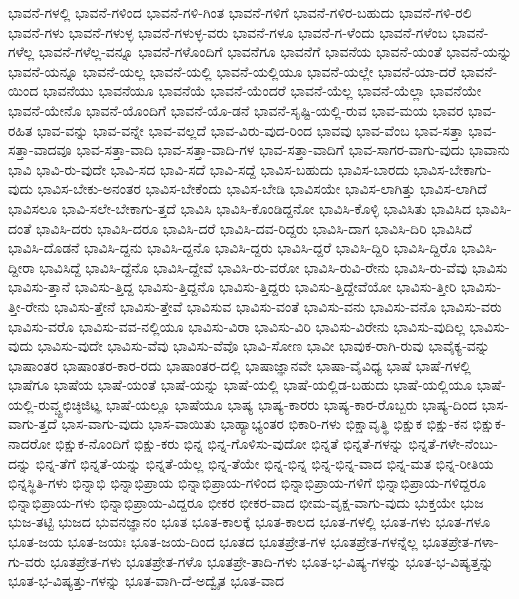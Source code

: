 {ಭಾವನೆ-ಗಳಲ್ಲಿ
ಭಾವನೆ-ಗಳಿಂದ
ಭಾವನೆ-ಗಳಿ-ಗಿಂತ
ಭಾವನೆ-ಗಳಿಗೆ
ಭಾವನೆ-ಗಳಿರ-ಬಹುದು
ಭಾವನೆ-ಗಳಿ-ರಲಿ
ಭಾವನೆ-ಗಳು
ಭಾವನೆ-ಗಳುಳ್ಳ
ಭಾವನೆ-ಗಳುಳ್ಳ-ವರು
ಭಾವನೆ-ಗಳೂ
ಭಾವನೆ-ಗ-ಳೆಂದು
ಭಾವನೆ-ಗಳೆಂಬ
ಭಾವನೆ-ಗಳೆಲ್ಲ
ಭಾವನೆ-ಗಳೆಲ್ಲ-ವನ್ನೂ
ಭಾವನೆ-ಗಳೊಂದಿಗೆ
ಭಾವನೆಗೂ
ಭಾವನೆಗೆ
ಭಾವನೆಯ
ಭಾವನೆ-ಯಂತೆ
ಭಾವನೆ-ಯನ್ನು
ಭಾವನೆ-ಯನ್ನೂ
ಭಾವನೆ-ಯಲ್ಲ
ಭಾವನೆ-ಯಲ್ಲಿ
ಭಾವನೆ-ಯಲ್ಲಿಯೂ
ಭಾವನೆ-ಯಲ್ಲೇ
ಭಾವನೆ-ಯಾ-ದರೆ
ಭಾವನೆ-ಯಿಂದ
ಭಾವನೆಯು
ಭಾವನೆಯೂ
ಭಾವನೆಯೆ
ಭಾವನೆ-ಯೆಂದರೆ
ಭಾವನೆ-ಯೆಲ್ಲ
ಭಾವನೆ-ಯೆಲ್ಲಾ
ಭಾವನೆಯೇ
ಭಾವನೆ-ಯೇನೊ
ಭಾವನೆ-ಯೊಂದಿಗೆ
ಭಾವನೆ-ಯೊ-ಡನೆ
ಭಾವನೆ-ಸೃಷ್ಟಿ-ಯಲ್ಲಿ-ರುವ
ಭಾವ-ಮಯ
ಭಾವರ
ಭಾವ-ರಹಿತ
ಭಾವ-ವನ್ನು
ಭಾವ-ವನ್ನೇ
ಭಾವ-ವಲ್ಲದೆ
ಭಾವ-ವಿರು-ವುದ-ರಿಂದ
ಭಾವವು
ಭಾವ-ವೆಂಬ
ಭಾವ-ಸತ್ತಾ
ಭಾವ-ಸತ್ತಾ-ವಾದವೂ
ಭಾವ-ಸತ್ತಾ-ವಾದಿ
ಭಾವ-ಸತ್ತಾ-ವಾದಿ-ಗಳ
ಭಾವ-ಸತ್ತಾ-ವಾದಿಗೆ
ಭಾವ-ಸಾಗರ-ವಾಗು-ವುದು
ಭಾವಾನು
ಭಾವಿ
ಭಾವಿ-ರು-ವುದೇ
ಭಾವಿ-ಸದ
ಭಾವಿ-ಸದೆ
ಭಾವಿ-ಸದ್ದೆ
ಭಾವಿಸ-ಬಹುದು
ಭಾವಿಸ-ಬಾರದು
ಭಾವಿಸ-ಬೇಕಾಗು-ವುದು
ಭಾವಿಸ-ಬೇಕು-ಅನಂತರ
ಭಾವಿಸ-ಬೇಕೆಂದು
ಭಾವಿಸ-ಬೇಡಿ
ಭಾವಿಸಯೇ
ಭಾವಿಸ-ಲಾಗಿತ್ತು
ಭಾವಿಸ-ಲಾಗಿದೆ
ಭಾವಿಸಲೂ
ಭಾವಿ-ಸಲೇ-ಬೇಕಾಗು-ತ್ತದೆ
ಭಾವಿಸಿ
ಭಾವಿಸಿ-ಕೊಂಡಿದ್ದನೋ
ಭಾವಿಸಿ-ಕೊಳ್ಳಿ
ಭಾವಿಸಿತು
ಭಾವಿಸಿದ
ಭಾವಿಸಿ-ದಂತೆ
ಭಾವಿಸಿ-ದರು
ಭಾವಿಸಿ-ದರೂ
ಭಾವಿಸಿ-ದರೆ
ಭಾವಿಸಿ-ದವ-ರಿದ್ದರು
ಭಾವಿಸಿ-ದಾಗ
ಭಾವಿಸಿ-ದಿರಿ
ಭಾವಿಸಿದೆ
ಭಾವಿಸಿ-ದೊಡನೆ
ಭಾವಿಸಿ-ದ್ದನು
ಭಾವಿಸಿ-ದ್ದನೊ
ಭಾವಿಸಿ-ದ್ದರು
ಭಾವಿಸಿ-ದ್ದರೆ
ಭಾವಿಸಿ-ದ್ದಿರಿ
ಭಾವಿಸಿ-ದ್ದಿರೊ
ಭಾವಿಸಿ-ದ್ದೀರಾ
ಭಾವಿಸಿದ್ದೆ
ಭಾವಿಸಿ-ದ್ದೆನೊ
ಭಾವಿಸಿ-ದ್ದೇವೆ
ಭಾವಿಸಿ-ರು-ವರೋ
ಭಾವಿಸಿ-ರುವಿ-ರೇನು
ಭಾವಿಸಿ-ರು-ವೆವು
ಭಾವಿಸು
ಭಾವಿಸು-ತ್ತಾನೆ
ಭಾವಿಸು-ತ್ತಿದ್ದ
ಭಾವಿಸು-ತ್ತಿದ್ದನೊ
ಭಾವಿಸು-ತ್ತಿದ್ದರು
ಭಾವಿಸು-ತ್ತಿದ್ದೇವೆಯೋ
ಭಾವಿಸು-ತ್ತೀರಿ
ಭಾವಿಸು-ತ್ತೀ-ರೇನು
ಭಾವಿಸು-ತ್ತೇನೆ
ಭಾವಿಸು-ತ್ತೇವೆ
ಭಾವಿಸುವ
ಭಾವಿಸು-ವಂತೆ
ಭಾವಿಸು-ವನು
ಭಾವಿಸು-ವನೊ
ಭಾವಿಸು-ವರು
ಭಾವಿಸು-ವರೊ
ಭಾವಿಸು-ವವ-ನಲ್ಲಿಯೂ
ಭಾವಿಸು-ವಿರಾ
ಭಾವಿಸು-ವಿರಿ
ಭಾವಿಸು-ವಿರೇನು
ಭಾವಿಸು-ವುದಿಲ್ಲ
ಭಾವಿಸು-ವುದು
ಭಾವಿಸು-ವುದೇ
ಭಾವಿಸು-ವೆವು
ಭಾವಿಸು-ವೆವೊ
ಭಾವಿ-ಸೋಣ
ಭಾವೀ
ಭಾವುಕ-ರಾಗಿ-ರುವು
ಭಾವೈಕ್ಯ-ವನ್ನು
ಭಾಷಾಂತರ
ಭಾಷಾಂತರ-ಕಾರ-ರದು
ಭಾಷಾಂತರ-ದಲ್ಲಿ
ಭಾಷಾಜ್ಞಾನವೇ
ಭಾಷಾ-ವೈವಿಧ್ಯ
ಭಾಷೆ
ಭಾಷೆ-ಗಳಲ್ಲಿ
ಭಾಷೆಗೂ
ಭಾಷೆಯ
ಭಾಷೆ-ಯಂತೆ
ಭಾಷೆ-ಯನ್ನು
ಭಾಷೆ-ಯಲ್ಲಿ
ಭಾಷೆ-ಯಲ್ಲಿಡ-ಬಹುದು
ಭಾಷೆ-ಯಲ್ಲಿಯೂ
ಭಾಷೆ-ಯಲ್ಲಿ-ರುವ್ಚ್ಟಛಿಚ್ಠಿಜಿಟ್ಞ
ಭಾಷೆ-ಯಲ್ಲೂ
ಭಾಷೆಯೂ
ಭಾಷ್ಯ
ಭಾಷ್ಯ-ಕಾರರು
ಭಾಷ್ಯ-ಕಾರ-ರೊಬ್ಬರು
ಭಾಷ್ಯ-ದಿಂದ
ಭಾಸ-ವಾಗು-ತ್ತದೆ
ಭಾಸ-ವಾಗು-ವುದು
ಭಾಸ-ವಾಯಿತು
ಭಾಹ್ಯಾಭ್ಯಂತರ
ಭಿಕಾರಿ-ಗಳು
ಭಿಕ್ಷಾವೃತ್ಥಿ
ಭಿಕ್ಷುಕ
ಭಿಕ್ಷು-ಕನ
ಭಿಕ್ಷುಕ-ನಾದರೋ
ಭಿಕ್ಷುಕ-ನೊಂದಿಗೆ
ಭಿಕ್ಷು-ಕರು
ಭಿನ್ನ
ಭಿನ್ನ-ಗೊಳಿಸು-ವುದೋ
ಭಿನ್ನತೆ
ಭಿನ್ನತೆ-ಗಳನ್ನು
ಭಿನ್ನತೆ-ಗಳೇ-ನೆಂಬು-ದನ್ನು
ಭಿನ್ನ-ತೆಗೆ
ಭಿನ್ನತೆ-ಯನ್ನು
ಭಿನ್ನತೆ-ಯೆಲ್ಲ
ಭಿನ್ನ-ತೆಯೇ
ಭಿನ್ನ-ಭಿನ್ನ
ಭಿನ್ನ-ಭಿನ್ನ-ವಾದ
ಭಿನ್ನ-ಮತ
ಭಿನ್ನ-ರೀತಿಯ
ಭಿನ್ನಸ್ಥಿತಿ-ಗಳು
ಭಿನ್ನಾಭಿ
ಭಿನ್ನಾಭಿಪ್ರಾಯ
ಭಿನ್ನಾಭಿಪ್ರಾಯ-ಗಳಿಂದ
ಭಿನ್ನಾಭಿಪ್ರಾಯ-ಗಳಿಗೆ
ಭಿನ್ನಾಭಿಪ್ರಾಯ-ಗಳಿದ್ದರೂ
ಭಿನ್ನಾಭಿಪ್ರಾಯ-ಗಳು
ಭಿನ್ನಾಭಿಪ್ರಾಯ-ವಿದ್ದರೂ
ಭೀಕರ
ಭೀಕರ-ವಾದ
ಭೀಮ-ವೃಕ್ಷ-ವಾಗು-ವುದು
ಭುಕ್ತಯೇ
ಭುಜ
ಭುಜ-ತಟ್ಟಿ
ಭುಜದ
ಭುವನಜ್ಞಾನಂ
ಭೂತ
ಭೂತ-ಕಾಲಕ್ಕೆ
ಭೂತ-ಕಾಲದ
ಭೂತ-ಗಳಲ್ಲಿ
ಭೂತ-ಗಳು
ಭೂತ-ಗಳೂ
ಭೂತ-ಜಯ
ಭೂತ-ಜಯಃ
ಭೂತ-ಜಯ-ದಿಂದ
ಭೂತದ
ಭೂತಪ್ರೇತ-ಗಳ
ಭೂತಪ್ರೇತ-ಗಳನ್ನೆಲ್ಲ
ಭೂತಪ್ರೇತ-ಗಳಾ-ಗು-ವರು
ಭೂತಪ್ರೇತ-ಗಳು
ಭೂತಪ್ರೇತ-ಗಳೊ
ಭೂತಪ್ರೇ-ತಾದಿ-ಗಳು
ಭೂತ-ಭ-ವಿಷ್ಯ-ಗಳನ್ನು
ಭೂತ-ಭ-ವಿಷ್ಯತ್ತನ್ನು
ಭೂತ-ಭ-ವಿಷ್ಯತ್ತು-ಗಳನ್ನು
ಭೂತ-ವಾಗಿ-ದೆ-ಅದ್ವೈತ
ಭೂತ-ವಾದ
}
